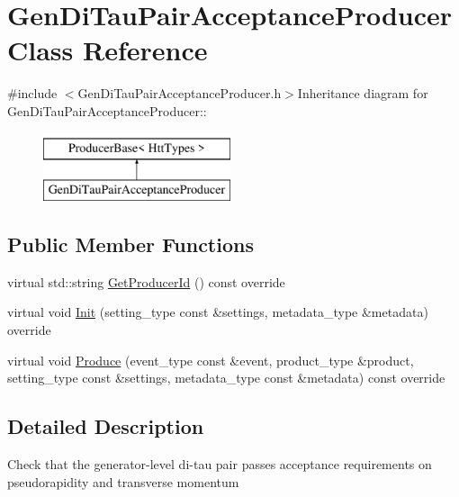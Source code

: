 \hypertarget{classGenDiTauPairAcceptanceProducer}{
\section{GenDiTauPairAcceptanceProducer Class Reference}
\label{classGenDiTauPairAcceptanceProducer}
}


{\ttfamily \#include $<$GenDiTauPairAcceptanceProducer.h$>$}Inheritance diagram for GenDiTauPairAcceptanceProducer::\begin{figure}[H]
\begin{center}
\leavevmode
\includegraphics[height=2cm]{classGenDiTauPairAcceptanceProducer}
\end{center}
\end{figure}
\subsection*{Public Member Functions}
\begin{DoxyCompactItemize}
\item 
virtual std::string \hyperlink{classGenDiTauPairAcceptanceProducer_a4a26fcb67656923c42a1ae82f2ece946}{GetProducerId} () const override
\item 
virtual void \hyperlink{classGenDiTauPairAcceptanceProducer_ad9bb168cd309459d3477d08503756bbc}{Init} (setting\_\-type const \&settings, metadata\_\-type \&metadata) override
\item 
virtual void \hyperlink{classGenDiTauPairAcceptanceProducer_a03cfc845e74774274efd4ea00822cd90}{Produce} (event\_\-type const \&event, product\_\-type \&product, setting\_\-type const \&settings, metadata\_\-type const \&metadata) const override
\end{DoxyCompactItemize}


\subsection{Detailed Description}
Check that the generator-\/level di-\/tau pair passes acceptance requirements on pseudorapidity and transverse momentum 

